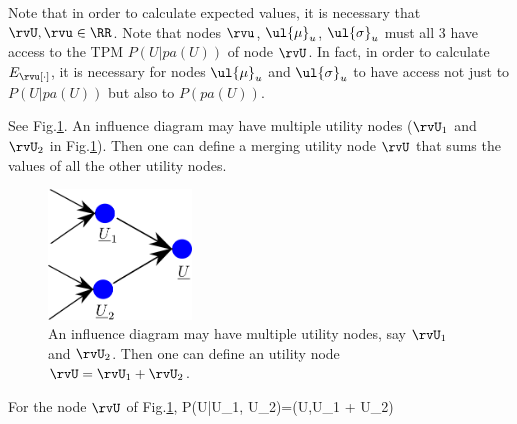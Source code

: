 Note that in order to
calculate expected values,
it is necessary that
$\rvU, \rvu\in \RR$. Note that
nodes $\rvu$, $\ul{\mu}_u$, $\ul{\sigma}_u$
must all 3 have access
to the 
TPM
$P(U|pa(U))$ of node $\rvU$.
In fact, in order  to
calculate $E_\rvu[\cdot]$,
it is necessary for
nodes $\ul{\mu}_u$ and 
 $\ul{\sigma}_u$
to have access not just to 
$P(U|pa(U))$ but also to
$P(pa(U))$.

See Fig.\ref{fig-util-merge}.
An influence
diagram may have multiple
utility nodes ($\rvU_1$ and
$\rvU_2$ in Fig.\ref{fig-util-merge}).
Then one can define a merging
utility node $\rvU$ that sums
the values of
all the other utility 
nodes.

\begin{figure}[h!]
\centering
\includegraphics[width=1.5in]
{influ-diag/util-merge.png}
\caption{An influence
diagram may have multiple
utility nodes, say $\rvU_1$ and
$\rvU_2$. Then
one can define an
utility node $\rvU=\rvU_1 + \rvU_2$. } 
\label{fig-util-merge}
\end{figure}

For the node $\rvU$ of 
Fig.\ref{fig-util-merge},
\beq\color{blue}
P(U|U_1, U_2)=\delta(U,U_1 + U_2)
\eeq